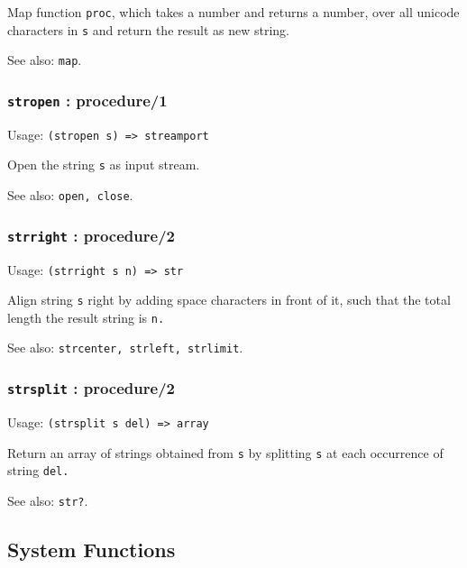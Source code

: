 \documentclass[
]{article}
\newcommand{\passthrough}[1]{#1}
\begin{document}
Map function \passthrough{\lstinline!proc!}, which takes a number and
returns a number, over all unicode characters in
\passthrough{\lstinline!s!} and return the result as new string.

See also: \passthrough{\lstinline!map!}.

\hypertarget{stropen-procedure1}{%
\subsubsection{\texorpdfstring{\texttt{stropen} :
procedure/1}{stropen : procedure/1}}\label{stropen-procedure1}}

Usage: \passthrough{\lstinline!(stropen s) => streamport!}

Open the string \passthrough{\lstinline!s!} as input stream.

See also: \passthrough{\lstinline!open, close!}.

\hypertarget{strright-procedure2}{%
\subsubsection{\texorpdfstring{\texttt{strright} :
procedure/2}{strright : procedure/2}}\label{strright-procedure2}}

Usage: \passthrough{\lstinline!(strright s n) => str!}

Align string \passthrough{\lstinline!s!} right by adding space
characters in front of it, such that the total length the result string
is \passthrough{\lstinline!n.!}

See also: \passthrough{\lstinline!strcenter, strleft, strlimit!}.

\hypertarget{strsplit-procedure2}{%
\subsubsection{\texorpdfstring{\texttt{strsplit} :
procedure/2}{strsplit : procedure/2}}\label{strsplit-procedure2}}

Usage: \passthrough{\lstinline!(strsplit s del) => array!}

Return an array of strings obtained from \passthrough{\lstinline!s!} by
splitting \passthrough{\lstinline!s!} at each occurrence of string
\passthrough{\lstinline!del.!}

See also: \passthrough{\lstinline!str?!}.

\hypertarget{system-functions}{%
\subsection{System Functions}\label{system-functions}}
\end{document}
